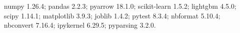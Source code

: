 numpy 1.26.4; pandas 2.2.3; pyarrow 18.1.0; scikit-learn 1.5.2; lightgbm 4.5.0; scipy 1.14.1; matplotlib 3.9.3; joblib 1.4.2; pytest 8.3.4; nbformat 5.10.4; nbconvert 7.16.4; ipykernel 6.29.5; pyparsing 3.2.0.
